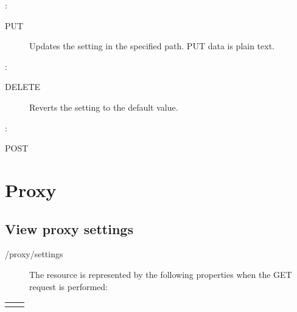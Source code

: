 \documentclass[letterpaper,10pt,english]{sphinxmanual}
\begin{document}
:

\begin{sphinxVerbatim}[commandchars=\\\{\}]
\end{sphinxVerbatim}
\begin{description}
\item[{ PUT}] \leavevmode
Updates the setting in the specified path. PUT data is plain text.

\end{description}

:

\begin{sphinxVerbatim}[commandchars=\\\{\}]
\end{sphinxVerbatim}
\begin{description}
\item[{ DELETE}] \leavevmode
Reverts the setting to the default value.

\end{description}

:

\begin{sphinxVerbatim}[commandchars=\\\{\}]
\end{sphinxVerbatim}

 POST


\section{Proxy}
\label{\detokenize{restapi:proxy}}

\subsection{View proxy settings}
\label{\detokenize{restapi:view-proxy-settings}}
 /proxy/settings
\begin{description}
\item[{}] \leavevmode
The resource is represented by the following properties when the GET request is performed:

\end{description}


\begin{savenotes}\sphinxattablestart
\centering
\begin{tabulary}{\linewidth}[t]{|T|T|}
\hline

&
\\
\hline&\\
\hline
\end{tabulary}
\par
\sphinxattableend\end{savenotes}
\end{document}
